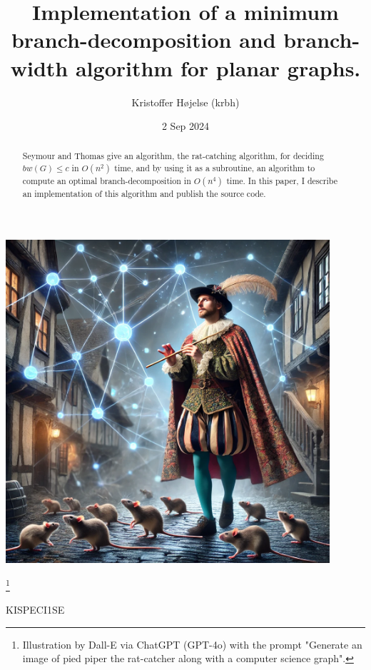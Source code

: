 \documentclass{article}
\title{Implementation of a minimum branch-decomposition and branch-width algorithm for planar graphs.}
\author{Kristoffer Højelse (krbh)}
\date{2 Sep 2024}
\begin{document}
\maketitle

\begin{center}
	\includegraphics[width=0.9\textwidth]{images/dalle-pied-piper-2.png}
\end{center}
\footnote{Illustration by Dall-E via ChatGPT (GPT-4o) with the prompt "Generate an image of pied piper the rat-catcher along with a computer science graph".}

\begin{center}
	KISPECI1SE
\end{center}

\newpage



\begin{abstract}
	Seymour and Thomas give an algorithm, the rat-catching algorithm, for deciding $bw(G) \leq c$ in $O(n^2)$ time, and by using it as a subroutine, an algorithm to compute an optimal branch-decomposition in $O(n^4)$ time. In this paper, I describe an implementation of this algorithm and publish the source code.
\end{abstract}
\end{document}
